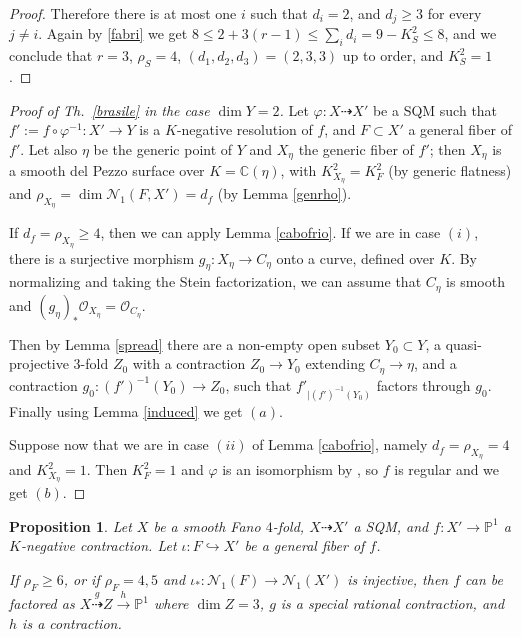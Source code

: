 \documentclass[a4paper,12pt]{amsart}
\newtheorem{proposition}[thm]{Proposition}
\theoremstyle{definition}
\numberwithin{figure}{section}
\numberwithin{table}{section}
\newcommand{\ph}{\varphi}
\newcommand{\ol}{\mathcal{O}}
\newcommand{\pr}{\mathbb{P}}
\newcommand{\C}{\mathbb{C}}
\newcommand{\N}{\mathcal{N}_1}
\begin{document}
\begin{proof}
     Therefore  there is at most one  $i$ such that $d_i=2$, and $d_j\geq 3$ for every $j\neq i$.       
Again by \eqref{fabri} we get $8\leq 2+3(r-1)\leq\sum_id_i=9-K_S^2\leq 8$, and we conclude that $r=3$, $\rho_S=4$, $(d_1,d_2,d_3)=(2,3,3)$ up to order, and $K_S^2=1$.
        \end{proof}
        \begin{proof}[Proof of Th.~\ref{brasile} in the case $\dim Y=2$]
  Let $\ph\colon X\dasharrow X'$ be a SQM such that $f':=f\circ\ph^{-1}\colon X'\to Y$ is a $K$-negative resolution of $f$, and $F\subset X'$ a general fiber of $f'$.
    Let also $\eta$ be the generic point of $Y$ and $X_\eta$ the generic fiber of $f'$; then $X_\eta$ is a smooth del Pezzo surface over $K=\C(\eta)$, with $K_{X_{\eta}}^2=K_F^2$ (by generic flatness) and $\rho_{X_{\eta}}=
  \dim\N(F,X')=d_f$ (by Lemma \ref{genrho}).

  If $d_f=\rho_{X_{\eta}}\geq 4$, then
  we can apply Lemma \ref{cabofrio}. If we are in case $(i)$,
 there is a surjective morphism $g_\eta\colon X_\eta\to C_{\eta}$ onto a curve, defined over $K$. By normalizing and taking the Stein factorization, we can assume that $C_{\eta}$ is smooth and $(g_\eta)_*\ol_{X_\eta}=\ol_{C_\eta}$.

  Then by Lemma \ref{spread} there are a non-empty open subset $Y_0\subset Y$,
  a quasi-projective $3$-fold $Z_0$ with a contraction $Z_0\to Y_0$ extending $C_\eta\to\eta$, and a contraction $g_0\colon (f')^{-1}(Y_0)\to Z_0$, such that $f'_{|(f')^{-1}(Y_0)}$ factors through $g_0$.
  Finally using Lemma \ref{induced} we get $(a)$.

  Suppose now that we are in case $(ii)$ of Lemma \ref{cabofrio}, namely $d_f=\rho_{X_{\eta}}= 4$ and $K_{ X_{\eta}}^2=1$. Then  $K_F^2=1$ and $\ph$ is an isomorphism by \cite[Lemma 5.10]{small}, so $f$ is regular and we get $(b)$.
\end{proof} 
\begin{proposition}\label{P1}
  Let $X$ be a smooth Fano $4$-fold, $X\dasharrow X'$ a SQM, and $f\colon X'\to\pr^1$ a $K$-negative contraction. Let $\iota\colon F\hookrightarrow X'$ be a general fiber of $f$.

  If $\rho_F\geq 6$, or if $\rho_F=4,5$ and $\iota_*\colon\N(F)\to\N(X')$ is injective, 
  then $f$ can be factored as $X\stackrel{g}{\dasharrow} Z\stackrel{h}{\to} \pr^1$ where $\dim Z=3$, $g$ is a special rational contraction, and $h$ is a contraction.
 \end{proposition}  
\end{document}
